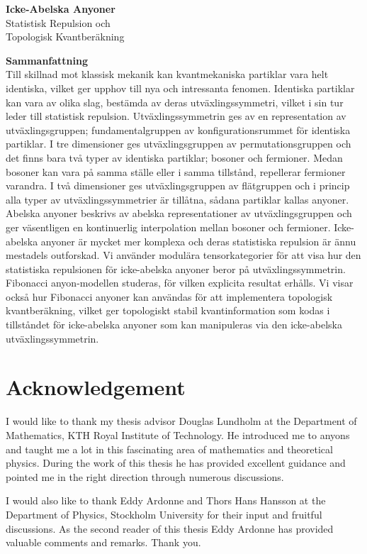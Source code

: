 \thispagestyle{plain}
\null
\begin{center}
  {\Huge\textbf{Icke-Abelska Anyoner}}\\[1em]
  {\huge Statistisk Repulsion och\\[0.3em]Topologisk Kvantberäkning}
\end{center}
\vspace{2.5cm}
{\huge\textbf{Sammanfattning}} \\[3em]
\noindent Till skillnad mot klassisk mekanik kan kvantmekaniska partiklar vara helt identiska, vilket ger upphov till nya och intressanta fenomen. Identiska partiklar kan vara av olika slag, bestämda av deras utväxlingssymmetri, vilket i sin tur leder till statistisk repulsion. Utväxlingssymmetrin ges av en representation av utväxlingsgruppen; fundamentalgruppen av konfigurationsrummet för identiska partiklar. I tre dimensioner ges utväxlingsgruppen av permutationsgruppen och det finns bara två typer av identiska partiklar; bosoner och fermioner. Medan bosoner kan vara på samma ställe eller i samma tillstånd, repellerar fermioner varandra. I två dimensioner ges utväxlingsgruppen av flätgruppen och i princip alla typer av utväxlingssymmetrier är tillåtna, sådana partiklar kallas anyoner. Abelska anyoner beskrivs av abelska representationer av utväxlingsgruppen och ger väsentligen en kontinuerlig interpolation mellan bosoner och fermioner. Icke-abelska anyoner är mycket mer komplexa och deras statistiska repulsion är ännu mestadels outforskad. Vi använder modulära tensorkategorier för att visa hur den statistiska repulsionen för icke-abelska anyoner beror på utväxlingssymmetrin. Fibonacci anyon-modellen studeras, för vilken explicita resultat erhålls. Vi visar också hur Fibonacci anyoner kan användas för att implementera topologisk kvantberäkning, vilket ger topologiskt stabil kvantinformation som kodas i tillståndet för icke-abelska anyoner som kan manipuleras via den icke-abelska utväxlingssymmetrin.

\newpage

\chapter*{Acknowledgement}

I would like to thank my thesis advisor Douglas Lundholm at the Department of Mathematics, KTH Royal Institute of Technology. He introduced me to anyons and taught me a lot in this fascinating area of mathematics and theoretical physics. During the work of this thesis he has provided excellent guidance and pointed me in the right direction through numerous discussions.


I would also like to thank Eddy Ardonne and Thors Hans Hansson at the Department of Physics, Stockholm University for their input and fruitful discussions. As the second reader of this thesis Eddy Ardonne has provided valuable comments and remarks. Thank you.
